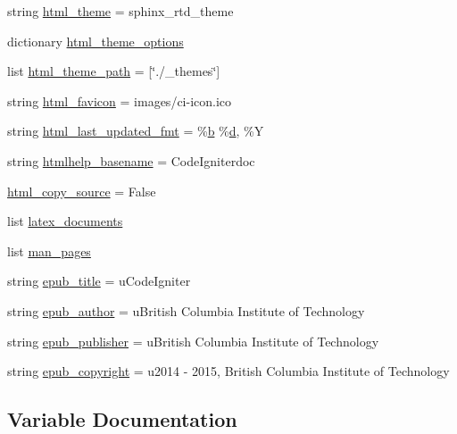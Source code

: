 \begin{DoxyCompactItemize}
string \hyperlink{namespaceconf_ae3cdb5291b613a54e31ca9520cddb940}{html\+\_\+theme} = \textquotesingle{}sphinx\+\_\+rtd\+\_\+theme\textquotesingle{}
\item 
dictionary \hyperlink{namespaceconf_abff8d0724bf3d78779f98fa828f1e1fe}{html\+\_\+theme\+\_\+options}
\item 
list \hyperlink{namespaceconf_ab3355566e70150ea4456b3249ce8fd24}{html\+\_\+theme\+\_\+path} = \mbox{[}\char`\"{}./\+\_\+themes\char`\"{}\mbox{]}
\item 
string \hyperlink{namespaceconf_a16a35b7581ad28822358fe74c1de14a2}{html\+\_\+favicon} = \textquotesingle{}images/ci-\/icon.\+ico\textquotesingle{}
\item 
string \hyperlink{namespaceconf_a14f49a7c55b2b5db78ffa82dc8a46648}{html\+\_\+last\+\_\+updated\+\_\+fmt} = \textquotesingle{}\%\hyperlink{assets_2js_2bootstrap_8min_8js_a398bb8542498d1b14178b02b99df309b}{b} \%\hyperlink{assets_2js_2bootstrap_8min_8js_aeb337d295abaddb5ec3cb34cc2e2bbc9}{d}, \%Y\textquotesingle{}
\item 
string \hyperlink{namespaceconf_a75a82d2191ce50cef1a4b6522da3c148}{htmlhelp\+\_\+basename} = \textquotesingle{}Code\+Igniterdoc\textquotesingle{}
\item 
\hyperlink{namespaceconf_a7ccc0b3d59ae620ede673e62fc9ab577}{html\+\_\+copy\+\_\+source} = False
\item 
list \hyperlink{namespaceconf_a19ce49f2838fb86624dc2d34e023baca}{latex\+\_\+documents}
\item 
list \hyperlink{namespaceconf_a09bebc3ead6c7c1acf6823c7a5609155}{man\+\_\+pages}
\item 
string \hyperlink{namespaceconf_a1d2f113ccea013e94bb23f7339033729}{epub\+\_\+title} = u\textquotesingle{}Code\+Igniter\textquotesingle{}
\item 
string \hyperlink{namespaceconf_a65d676afa893f71bef09ae1a4f1970d2}{epub\+\_\+author} = u\textquotesingle{}British Columbia Institute of Technology\textquotesingle{}
\item 
string \hyperlink{namespaceconf_a19616e2a147791c51388e107e7309c0f}{epub\+\_\+publisher} = u\textquotesingle{}British Columbia Institute of Technology\textquotesingle{}
\item 
string \hyperlink{namespaceconf_a8ea253124c547df38571acd738c10b1f}{epub\+\_\+copyright} = u\textquotesingle{}2014 -\/ 2015, British Columbia Institute of Technology\textquotesingle{}
\end{DoxyCompactItemize}


\subsection{Variable Documentation}
\hypertarget{namespaceconf_a6ad5f3290c14149f679301b770fa13f9}{}
